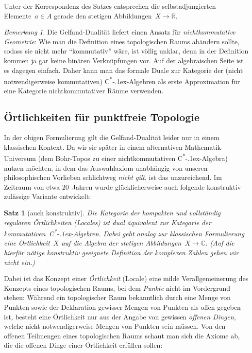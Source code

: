\documentclass[a4paper,ngerman,12pt]{scrartcl}
\theoremstyle{definition}
\theoremstyle{plain}
\newtheorem{satz}[defn]{Satz}
\theoremstyle{remark}
\newtheorem{bem}[defn]{Bemerkung}
\newcommand{\RR}{\mathbb{R}}
\newcommand{\CC}{\mathbb{C}}
\newcommand{\csalgebra}{C\textsuperscript{*}\kern-.1ex-Algebra}
\newcommand{\csalgebren}{C\textsuperscript{*}\kern-.1ex-Alge\-bren}
\renewcommand{\_}{\mathpunct{.}\,}
\newcommand{\?}{\,{:}\,}
\begin{document}
Unter der Korrespondenz des Satzes entsprechen die selbstadjungierten
Elemente~$a \in A$ gerade den stetigen Abbildungen~$X \to \RR$.

\begin{bem}Die Gelfand-Dualität liefert einen Ansatz für \emph{nichtkommutative
Geometrie}: Wie man die Definition eines topologischen Raums abändern sollte,
sodass sie nicht mehr "`kommutativ"' wäre, ist völlig unklar, denn in
der Definition kommen ja gar keine binären Verknüpfungen vor. Auf der algebraischen Seite
ist es dagegen einfach. Daher kann man das formale Duale zur Kategorie der
(nicht notwendigerweise kommutativen) \csalgebren{} als erste Approximation für
eine Kategorie nichtkommutativer Räume verwenden.
\end{bem}


\subsection{Örtlichkeiten für punktfreie Topologie}

In der obigen Formulierung gilt die Gelfand-Dualität leider nur in einem
klassischen Kontext. Da wir sie später in einem alternativen
Mathematik-Universum (dem Bohr-Topos zu einer nichtkommutativen \csalgebra)
nutzen möchten, in dem das Auswahlaxiom unabhängig von unseren philosophischen
Vorlieben schlichtweg \emph{nicht gilt}, ist das unzureichend. Im Zeitraum von
etwa 20~Jahren wurde glücklicherweise auch folgende konstruktiv zulässige Variante
entwickelt:

\begin{satz}[auch konstruktiv]Die Kategorie der kompakten und vollständig
regulären Örtlichkeiten (Locales) ist dual äquivalent zur Kategorie der
kommutativen~\csalgebren. Dabei geht analog zur klassischen Formulierung eine
Örtlichkeit~$X$ auf die Algebra der stetigen Abbildungen~$X \to \CC$.
(Auf die hierfür nötige konstruktiv geeignete Definition der komplexen Zahlen
gehen wir nicht ein.)
\end{satz}

Dabei ist das Konzept einer \emph{Örtlichkeit} (Locale) eine milde
Verallgemeinerung des Konzepts eines topologischen Raums, bei dem \emph{Punkte}
nicht im Vordergrund stehen: Während ein topologischer Raum bekanntlich durch
eine Menge von Punkten sowie der Deklaration gewisser Mengen von Punkten als
offen gegeben ist, besteht eine Örtlichkeit nur aus der Angabe von
gewissen \emph{offenen Dingen}, welche nicht notwendigerweise Mengen von
Punkten sein müssen. Von den offenen Teilmengen eines topologischen Raums
schaut man sich die Axiome ab, die die offenen Dinge einer Örtlichkeit
erfüllen sollen:
\end{document}
